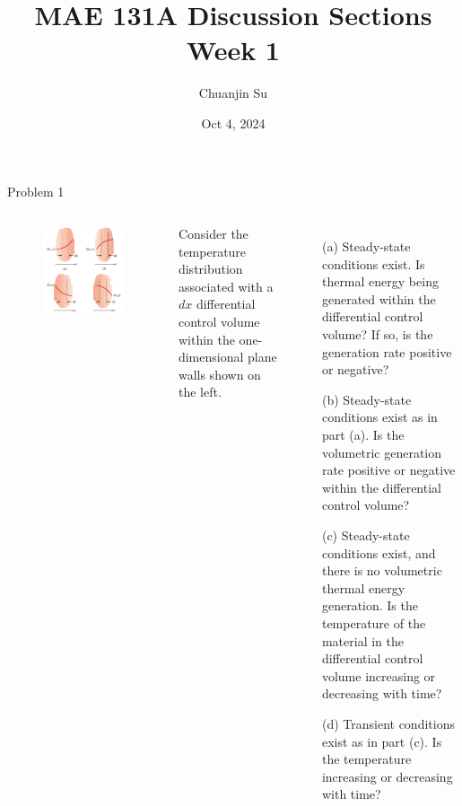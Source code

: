 \documentclass[9pt, aspectratio=169, handout]{beamer}
\title{MAE 131A Discussion Sections\\ Week 1}
\author{Chuanjin Su}
\institute[UCLA MAE]{Mechanical and Aerospace Engineering Department\\
    University of California, Los Angeles}
\date{Oct 4, 2024}
\begin{document}
\begin{frame}
    \titlepage
\end{frame}

\begin{frame}{Problem 1}
    \begin{columns}
        \begin{figure}
            \centering
            \includegraphics[width=\textwidth]{Figures/fig1.1.jpg}
        \end{figure}
        Consider the temperature distribution associated with a $dx$ differential control volume within the one-dimensional plane walls shown on the left.
        \begin{itemize}
            \item[(a)] Steady-state conditions exist. Is thermal energy being generated within the differential control volume? If so, is the generation rate positive or negative?
            \item[(b)] Steady-state conditions exist as in part (a). Is the volumetric generation rate positive or negative within the differential control volume?
            \item[(c)] Steady-state conditions  exist, and there is no volumetric thermal energy generation. Is the temperature of the material in the differential control volume increasing or decreasing with time?
            \item[(d)] Transient conditions exist as in part (c). Is the temperature increasing or decreasing with time?
        \end{itemize}
    \end{columns}
\end{frame}
\end{document}
